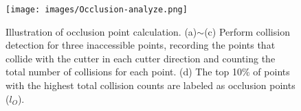 \begin{figure}[t]

\centering
\texttt{[image: images/Occlusion-analyze.png]}
\caption{Illustration of occlusion point calculation. (a)$\sim$(c) Perform collision detection for three inaccessible points, recording the points that collide with the cutter in each cutter direction and counting the total number of collisions for each point. (d) The top 10$\%$ of points with the highest total collision counts are labeled as occlusion points ($l_O$).}
  \label{fig:Occlusion-analyze}    
\end{figure}